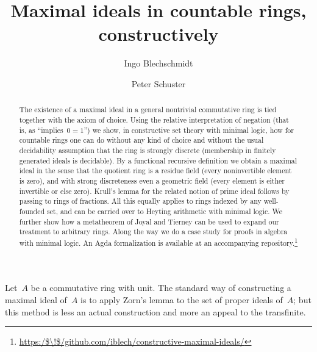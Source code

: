 \documentclass[envcountsect,envcountsame,runningheads]{llncs}
\renewcommand{\_}{\mathpunct{.}\,}
\begin{document}
\title{Maximal ideals in countable rings, constructively}
\author{Ingo Blechschmidt \and Peter Schuster}

\maketitle

\begin{abstract}
  The existence of a maximal ideal in a general nontrivial commutative
  ring is tied together with the axiom of choice.
  Using the relative interpretation of
  negation (that is, as ``implies~$0=1$'') we show, in constructive set theory with
  minimal logic, how for countable rings one can do without any kind of choice
  and without the usual decidability assumption that the ring is strongly
  discrete (membership in finitely generated ideals is decidable).
  By a functional
  recursive definition we obtain a maximal ideal in the sense that the quotient ring is a residue field
  (every noninvertible element is zero), and with strong discreteness
  even a geometric field (every element is either invertible or
  else zero). Krull's lemma for the related notion of prime ideal follows by
  passing to rings of fractions. All this equally applies to rings indexed by any well-founded set, and can be carried over to Heyting
  arithmetic with minimal logic.
  We further show how a metatheorem of Joyal and Tierney can be used to expand our
  treatment to arbitrary rings. Along the way we do a case study for proofs in
  algebra with minimal logic. An Agda formalization is available at an
  accompanying repository.\footnote{\url{https:/$\!$/github.com/iblech/constructive-maximal-ideals/}}
\end{abstract}

\noindent
Let~$A$ be a commutative ring with unit. The standard way of constructing a
maximal ideal of~$A$ is to apply Zorn's lemma to the set of proper ideals
of~$A$; but this method is less an actual construction and more an appeal to
the transfinite.
\end{document}

